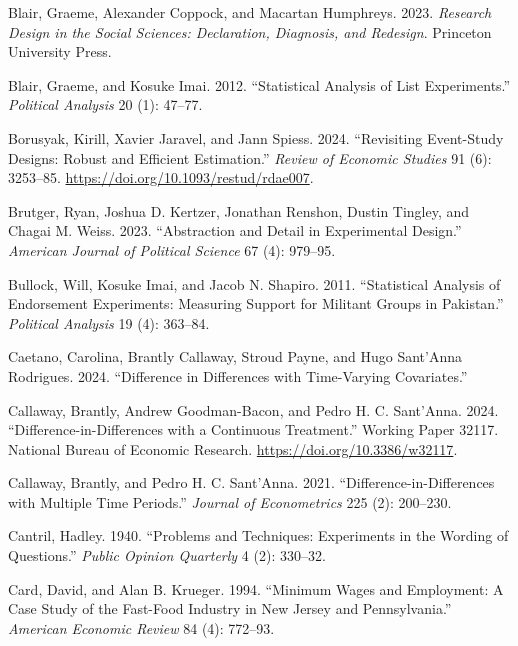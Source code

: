 \documentclass[
]{article}
\newlength{\cslhangindent}
\newenvironment{CSLReferences}[2] %
 {\begin{list}{}{%
  \setlength{\itemindent}{0pt}
  \setlength{\leftmargin}{0pt}
  \setlength{\parsep}{0pt}
  \ifodd #1
   \setlength{\leftmargin}{\cslhangindent}
   \setlength{\itemindent}{-1\cslhangindent}
  \fi
  \setlength{\itemsep}{#2\baselineskip}}}
 {\end{list}}
\begin{document}
\begin{CSLReferences}{1}{0}
Blair, Graeme, Alexander Coppock, and Macartan Humphreys. 2023. \emph{Research Design in the Social Sciences: Declaration, Diagnosis, and Redesign}. Princeton University Press.

Blair, Graeme, and Kosuke Imai. 2012. {``Statistical Analysis of List Experiments.''} \emph{Political Analysis} 20 (1): 47--77.

Borusyak, Kirill, Xavier Jaravel, and Jann Spiess. 2024. {``Revisiting Event-Study Designs: Robust and Efficient Estimation.''} \emph{Review of Economic Studies} 91 (6): 3253--85. \url{https://doi.org/10.1093/restud/rdae007}.

Brutger, Ryan, Joshua D. Kertzer, Jonathan Renshon, Dustin Tingley, and Chagai M. Weiss. 2023. {``Abstraction and Detail in Experimental Design.''} \emph{American Journal of Political Science} 67 (4): 979--95.

Bullock, Will, Kosuke Imai, and Jacob N. Shapiro. 2011. {``Statistical Analysis of Endorsement Experiments: Measuring Support for Militant Groups in {Pakistan}.''} \emph{Political Analysis} 19 (4): 363--84.

Caetano, Carolina, Brantly Callaway, Stroud Payne, and Hugo Sant'Anna Rodrigues. 2024. {``Difference in Differences with Time-Varying Covariates.''}

Callaway, Brantly, Andrew Goodman-Bacon, and Pedro H. C. Sant'Anna. 2024. {``Difference-in-Differences with a Continuous Treatment.''} Working Paper 32117. National Bureau of Economic Research. \url{https://doi.org/10.3386/w32117}.

Callaway, Brantly, and Pedro H. C. Sant'Anna. 2021. {``Difference-in-Differences with Multiple Time Periods.''} \emph{Journal of Econometrics} 225 (2): 200--230.

Cantril, Hadley. 1940. {``Problems and Techniques: Experiments in the Wording of Questions.''} \emph{Public Opinion Quarterly} 4 (2): 330--32.

Card, David, and Alan B. Krueger. 1994. {``Minimum Wages and Employment: A Case Study of the Fast-Food Industry in New Jersey and Pennsylvania.''} \emph{American Economic Review} 84 (4): 772--93.


\end{CSLReferences}
\end{document}
